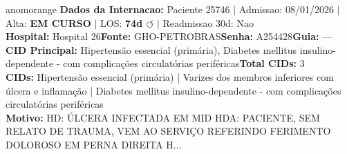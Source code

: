 \documentclass[a4paper,10pt]{article}
\begin{document}
\begin{anomalycard}[Internacao 161245 | GHO-PETROBRAS | ALTO (z=3.79)]{anomorange}
\textbf{Dados da Internacao:} Paciente 25746 $\mid$ Admissao: 08/01/2026 $\mid$ Alta: \textcolor{anomorange}{\textbf{EM CURSO}} $\mid$ LOS: \textbf{74d \textcolor{anomorange}{$\circlearrowleft$}} $\mid$ Readmissao 30d: Nao\\
\textbf{Hospital:} Hospital 26\quad\textbf{Fonte:} GHO-PETROBRAS\quad\textbf{Senha:} A254428\quad\textbf{Guia:} ---\\
\textbf{CID Principal:} {\small Hipertensão essencial (primária), Diabetes mellitus insulino-dependente - com complicações circulatórias periféricas}\quad\textbf{Total CIDs:} 3\\

\textbf{CIDs:} {\scriptsize Hipertensão essencial (primária) | Varizes dos membros inferiores com úlcera e inflamação | Diabetes mellitus insulino-dependente - com complicações circulatórias periféricas}\\

\textbf{Motivo:} {\scriptsize HD: ÚLCERA INFECTADA EM MID  HDA: PACIENTE, SEM RELATO DE TRAUMA, VEM AO SERVIÇO REFERINDO FERIMENTO DOLOROSO EM PERNA DIREITA H...}\\


\end{anomalycard}
\end{document}
